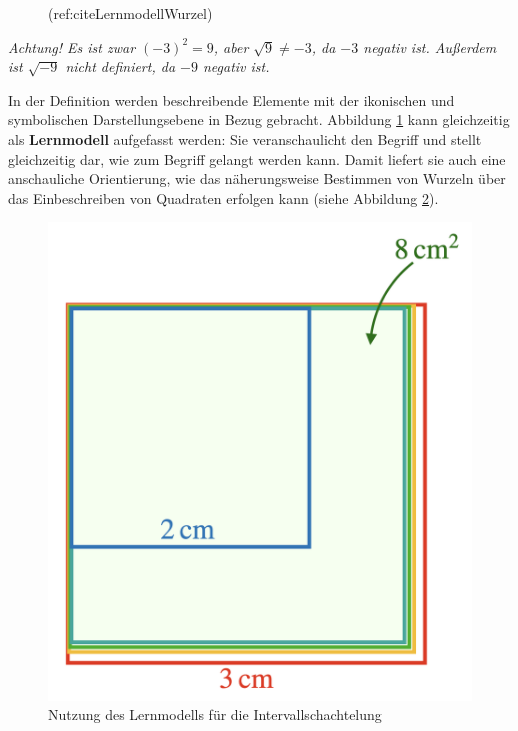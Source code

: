 \documentclass[
]{scrbook}
\theoremstyle{definition}
\theoremstyle{definition}
\theoremstyle{definition}
\theoremstyle{definition}
\theoremstyle{remark}
\begin{document}
\begin{enumerate}
\begin{figure}
{   }

   \caption{(ref:citeLernmodellWurzel)}\label{fig:LernmodellWurzel}
   \end{figure}

  \emph{Achtung! Es ist zwar \((-3)^2 = 9\), aber \(\sqrt{9} \neq -3\), da \(-3\) negativ ist. Außerdem ist \(\sqrt{-9}\) nicht definiert, da \(-9\) negativ ist.}

  In der Definition werden beschreibende Elemente mit der ikonischen und symbolischen Darstellungsebene in Bezug gebracht. Abbildung \ref{fig:LernmodellWurzel} kann gleichzeitig als \textbf{Lernmodell} aufgefasst werden: Sie veranschaulicht den Begriff und stellt gleichzeitig dar, wie zum Begriff gelangt werden kann. Damit liefert sie auch eine anschauliche Orientierung, wie das näherungsweise Bestimmen von Wurzeln über das Einbeschreiben von Quadraten erfolgen kann (siehe Abbildung \ref{fig:IntervallWurzel}).

  \begin{figure}

   {\centering \includegraphics[width=0.5\linewidth]{pictures/10-WurzelIntervall} 

   }

   \caption{Nutzung des Lernmodells für die Intervallschachtelung}\label{fig:IntervallWurzel}
   \end{figure}


\end{enumerate}
\end{document}
